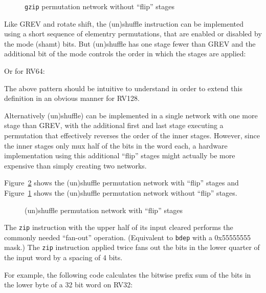 \begin{figure}[t]
\begin{center}

\end{center}
\caption{\texttt{gzip} permutation network without ``flip'' stages}
\label{permnet-gzip-noflip}
\end{figure}

Like GREV and rotate shift, the (un)shuffle instruction can be implemented using a short
sequence of elementry permutations, that are enabled or disabled by the mode (shamt)
bits. But (un)shuffle has one stage fewer than GREV and the additional bit of the mode
controls the order in which the stages are applied:



Or for RV64:



The above pattern should be intuitive to understand in order to extend
this definition in an obvious manner for RV128.

Alternatively (un)shuffle) can be implemented in a single network with one more
stage than GREV, with the additional first and last stage executing a
permutation that effectively reverses the order of the inner stages. However,
since the inner stages only mux half of the bits in the word each, a hardware
implementation using this additional ``flip'' stages might actually be more
expensive than simply creating two networks.



Figure~\ref{permnet-gzip-flip} shows the (un)shuffle permutation network with
``flip'' stages and Figure~\ref{permnet-gzip-noflip} shows the (un)shuffle
permutation network without ``flip'' stages.

\begin{figure}[t]
\begin{center}

\end{center}
\caption{(un)shuffle permutation network with ``flip'' stages}
\label{permnet-gzip-flip}
\end{figure}

The \texttt{zip} instruction with the upper half of its input cleared performs
the commonly needed ``fan-out'' operation. (Equivalent to {\tt bdep} with a
0x55555555 mask.) The \texttt{zip} instruction applied twice fans out the bits
in the lower quarter of the input word by a spacing of 4 bits.

For example, the following code calculates the bitwise prefix sum of the bits
in the lower byte of a 32 bit word on RV32:

